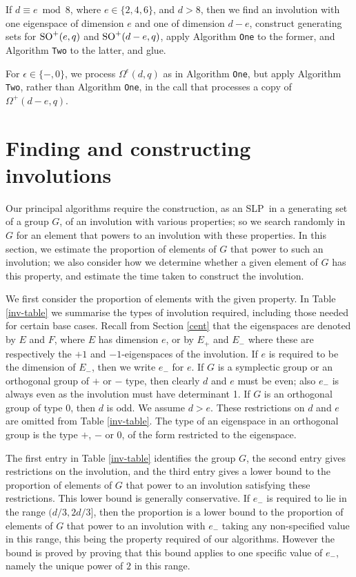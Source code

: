 \documentclass[12pt]{article}
\def\SO{{\rm SO}}
\def\SLP{{\rm SLP}}
\begin{document}
If $d\equiv e\bmod8$,
where $e\in\{2,4,6\}$,  and $d>8$, then we find an involution 
with one eigenspace of dimension $e$ and one of
dimension $d-e$, construct generating sets for 
$\SO^+(e,q)$ and $\SO^+(d-e,q)$, 
apply Algorithm {\tt One} to the former, and 
Algorithm {\tt Two} to the latter, and glue.

For $\epsilon \in \{-,0\}$, we process
$\Omega^\epsilon (d, q)$ as in Algorithm {\tt One}, 
but apply Algorithm {\tt Two},
rather than Algorithm {\tt One}, in the call 
that processes a copy of $\Omega^+(d-e,q)$.

\section{Finding and constructing involutions}
\label{Involution}

Our principal algorithms require the construction, as an \SLP\ in a 
generating set of a group $G$,
of an involution with various properties; so we search randomly in 
$G$ for an element that powers to an involution with
these properties.  In this section, we estimate the proportion of 
elements of $G$ that power
to such an involution; we also consider how we determine whether a 
given element of $G$ has this property, and estimate 
the time taken to construct the involution.  

We first consider the proportion of elements with the given property.
In Table \ref{inv-table} we summarise the types of involution required, 
including those needed for certain base cases.
Recall from Section \ref{cent} that 
the eigenspaces are denoted by $E$ and $F$, where $E$ has 
dimension $e$, or by $E_+$
and $E_-$ where these are respectively the $+1$ and $-1$-eigenspaces 
of the involution.
If $e$ is required to be the dimension of  $E_-$, then we write $e_-$ for $e$.
If $G$ is a symplectic group or an orthogonal group of $+$ or $-$ type, 
then clearly $d$ and
$e$ must be even; also $e_-$ is always even 
as the involution must have determinant 1.  
If $G$ is an orthogonal group of type $0$, then $d$ is odd. 
We assume $d>e$. These
restrictions on $d$ and $e$ are omitted from Table \ref{inv-table}.  
The type of an eigenspace in an orthogonal group is the 
type $+$, $-$ or $0$, of the form restricted to
the eigenspace.

The first entry in Table \ref{inv-table} identifies the 
group $G$, the second entry gives restrictions on the involution, 
and the third entry gives a lower bound to the proportion of elements of $G$
that power to an involution satisfying these restrictions.  This lower 
bound is generally conservative.  If $e_-$ is required
to lie in the range $(d/3,2d/3]$, then the proportion is a lower bound to 
the proportion of elements of $G$ that power to an involution
with $e_-$ taking any non-specified value in this range, this being 
the property required of our algorithms.  However the bound is
proved by proving that this bound applies to one specific value of 
$e_-$, namely the unique power of $2$ in this range.
\end{document}
